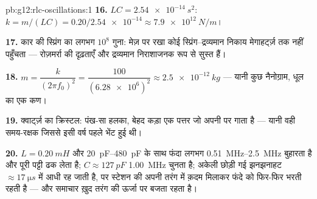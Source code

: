 \begin{solution}{pb:g12:rlc-oscillations:1}
\textbf{16.} $LC = \qty{2.54e-14}{s^2}$: $k = m/(LC) =
0.20/\num{2.54e-14} \approx \qty{7.9e12}{N/m}$।

\textbf{17.} कार की स्प्रिंग का लगभग $10^8$ गुना: मेज़ पर रखा कोई
स्प्रिंग--द्रव्यमान निकाय मेगाहर्ट्ज़ तक नहीं पहुँचता --- रोज़मर्रा की दृढ़ताएँ
और द्रव्यमान निराशाजनक रूप से सुस्त हैं।

\textbf{18.} $m = \dfrac{k}{(2\pi f_0)^2} = \dfrac{100}
{(\num{6.28e6})^2} \approx \qty{2.5e-12}{kg}$ --- यानी कुछ नैनोग्राम, धूल का एक कण।

\textbf{19.} क्वार्ट्ज़ का क्रिस्टल: पंख-सा हलका, बेहद कड़ा एक पत्तर जो अपनी
 पर गाता है --- यानी वही समय-रक्षक जिससे इसी वर्ष
पहले भेंट हुई थी।

\textbf{20.} $L = \qty{0.20}{mH}$ और \qtyrange{20}{480}{pF} के साथ फंदा लगभग
\qtyrange{0.51}{2.5}{MHz} बुहारता है और पूरी पट्टी ढक लेता है; $C \approx \qty{127}{pF}$
\qty{1.00}{MHz} चुनता है; अकेली छोड़ी गई झनझनाहट $\approx \qty{17}{\micro s}$ में आधी रह जाती है, पर स्टेशन
की अपनी तरंग  में क़दम मिलाकर फंदे को फिर-फिर भरती रहती है ---
और समाचार ख़ुद तरंग की ऊर्जा पर बजता रहता है।
\end{solution}
